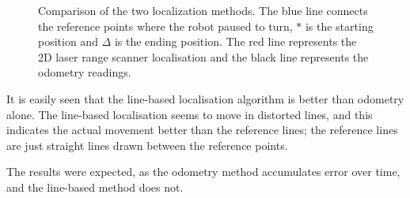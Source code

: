 \begin{figure}[H]
\centering
{}
\caption[Comparison of the two localization methods.]{Comparison of the two localization methods.
The blue line connects the reference points where the robot paused to turn,
$*$ is the starting position and $\Delta$ is the ending position.
The red line represents the 2D laser range scanner localisation and the black line represents the odometry readings.}
\label{fig:comparisonOfEncoderVSScanner}
\end{figure}

It is easily seen that the line-based localisation algorithm is better than odometry alone.
The line-based localisation seems to move in distorted lines, and this indicates the actual movement
better than the reference lines; the reference lines are just straight lines drawn between the reference points.


The results were expected, as the odometry method accumulates error over time, and the line-based method does not.

